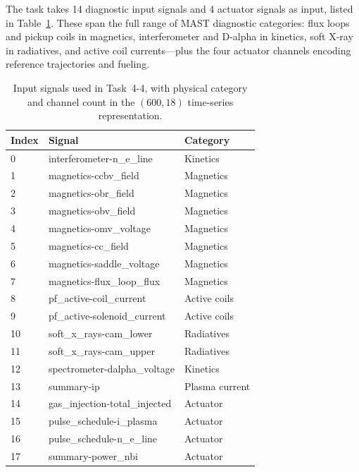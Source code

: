 \documentclass[10pt,twocolumn]{article}
\begin{document}
The task takes 14 diagnostic input signals and 4 actuator signals as
input, listed in Table~\ref{tab:signals}. These span the full range of
MAST diagnostic categories: flux loops and pickup coils in magnetics,
interferometer and D-alpha in kinetics, soft X-ray in radiatives, and
active coil currents—plus the four actuator channels encoding
reference trajectories and fueling.

\begin{table}[H]
\centering
\caption{Input signals used in Task~4-4, with physical category and
channel count in the $(600, 18)$ time-series representation.}
\label{tab:signals}
\footnotesize
\begin{tabular}{lll}
\toprule
Index & Signal & Category \\
\midrule
0  & interferometer-n\_e\_line         & Kinetics \\
1  & magnetics-ccbv\_field             & Magnetics \\
2  & magnetics-obr\_field              & Magnetics \\
3  & magnetics-obv\_field              & Magnetics \\
4  & magnetics-omv\_voltage            & Magnetics \\
5  & magnetics-cc\_field               & Magnetics \\
6  & magnetics-saddle\_voltage         & Magnetics \\
7  & magnetics-flux\_loop\_flux        & Magnetics \\
8  & pf\_active-coil\_current          & Active coils \\
9  & pf\_active-solenoid\_current      & Active coils \\
10 & soft\_x\_rays-cam\_lower          & Radiatives \\
11 & soft\_x\_rays-cam\_upper          & Radiatives \\
12 & spectrometer-dalpha\_voltage      & Kinetics \\
13 & summary-ip                        & Plasma current \\
14 & gas\_injection-total\_injected    & Actuator \\
15 & pulse\_schedule-i\_plasma         & Actuator \\
16 & pulse\_schedule-n\_e\_line        & Actuator \\
17 & summary-power\_nbi                & Actuator \\
\bottomrule
\end{tabular}
\end{table}
\end{document}
